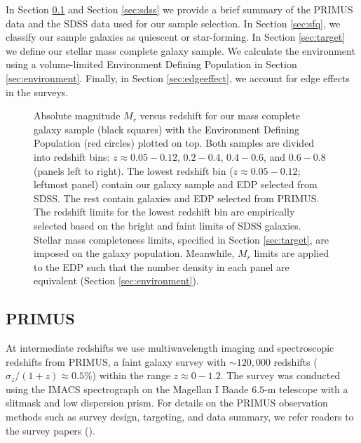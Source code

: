 \documentclass{emulateapj}
\begin{document}
In Section \ref{sec:primus} and Section \ref{sec:sdss} we provide a
brief summary of the PRIMUS data and the SDSS data used for our sample
selection.  In Section \ref{sec:sfq}, we classify our sample galaxies
as quiescent or star-forming.  In Section \ref{sec:target} we define
our stellar mass complete galaxy sample.  We calculate the environment
using a volume-limited Environment Defining Population in Section
\ref{sec:environment}.  Finally, in Section \ref{sec:edgeeffect}, we
account for edge effects in the surveys.

\begin{figure*}
    \begin{center}
        \leavevmode
        \caption{Absolute magnitude $M_{r}$ versus redshift for our mass complete galaxy sample (black squares) with the Environment Defining Population (red circles) plotted on top. Both samples are divided into redshift bins: $z \approx 0.05-0.12$, $0.2-0.4$, $0.4-0.6$, and $0.6-0.8$ (panels left to right). The lowest redshift bin ($z \approx 0.05-0.12$; leftmost panel) contain our galaxy sample and EDP selected from SDSS. The rest contain galaxies and EDP selected from PRIMUS. The redshift limits for the lowest redshift bin are empirically selected based on the bright and faint limits of SDSS galaxies. Stellar mass completeness limits, specified in Section \ref{sec:target}, are imposed on the galaxy population. Meanwhile, $M_{r}$ limits are applied to the EDP such that the number density in each panel are equivalent (Section \ref{sec:environment}).} \label{fig:targetEDP}
    \end{center}
\end{figure*}
\subsection{PRIMUS} \label{sec:primus}
At intermediate redshifts we use multiwavelength imaging and
spectroscopic redshifts from PRIMUS, a faint galaxy survey with $\sim
120,000$ redshifts ($\sigma_z/(1+z) \approx 0.5 \%$) within the range
$z \approx 0-1.2$. The survey was conducted using the IMACS
spectrograph on the Magellan I Baade $6.5$-m telescope with a slitmask and low dispersion prism. For details on the PRIMUS observation methods such as survey design, targeting, and data summary, we refer readers to the survey papers (\citealt{Coil:2011aa, Cool:2013aa}). 
\end{document}
